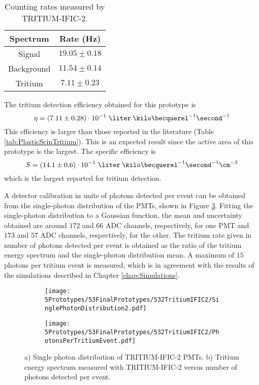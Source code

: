 \begin{table}[htbp]
\centering{}%
\begin{tabular}{cc}
\toprule 
Spectrum & Rate (Hz) \tabularnewline
\midrule
\midrule 
Signal & $19.05 \pm 0.18$ \tabularnewline
Background & $11.54 \pm 0.14$ \tabularnewline  
Tritium & $7.11 \pm 0.23$ \tabularnewline
\bottomrule
\end{tabular}
\caption{Counting rates measured by TRITIUM-IFIC-2.}
\label{tab:CountsPerSecondTRITIUMIFIC2}
\end{table}
The tritium detection efficiency obtained for this prototype is $$\eta = (7.11 \pm 0.28)\cdot{} 10^{-1}~\liter\:\kilo\becquerel^{-1}\second^{-1}$$ 
This efficiency is larger than those reported in the literature (Table \ref{tab:PlasticScinTritium}). This is an expected result since the active area of this prototype is the largest. The specific efficiency is
$$S=(14.1 \pm 0.6)\cdot{} 10^{-5}~\liter\:\kilo\becquerel^{-1}\second^{-1}\cm^{-2}$$
which is the largest reported for tritium detection. 

A detector calibration in units of photons detected per event can be obtained from the single-photon distribution of the PMTs, shown in Figure \ref{fig:PhotonsPerTritiumEventIFIC2}. Fitting the single-photon distribution to a Gaussian function, the mean and uncertainty obtained are around $172$ and $66$ ADC channels, respectively, for one PMT and $173$ and $57$ ADC channels, respectively, for the other. The tritium rate given in number of photons detected per event is obtained as the ratio of the tritium energy spectrum and the single-photon distribution mean. A maximum of $15$ photons per tritium event is measured, which is in agreement with the results of the simulations described in Chapter \ref{chap:Simulations}. 

\begin{figure}
\centering
    \begin{subfigure}[b]{0.9\textwidth}
    \centering
    \texttt{[image: 5Prototypes/53FinalPrototypes/532TritiumIFIC2/SinglePhotonDistribution2.pdf]}  
    \caption{\label{subfig:SinglePhotonDistributionIFIC2}}
    \end{subfigure}
    \hfill
    \begin{subfigure}[b]{0.9\textwidth}
    \centering
    \texttt{[image: 5Prototypes/53FinalPrototypes/532TritiumIFIC2/PhotonsPerTritiumEvent.pdf]}  
    \caption{\label{subfig:TritiumSignalTRITIUMIFIC2}}
    \end{subfigure}
 \caption{a) Single photon distribution of TRITIUM-IFIC-2 PMTs. b) Tritium energy spectrum measured with TRITIUM-IFIC-2 versus number of photons detected per event.}
 \label{fig:PhotonsPerTritiumEventIFIC2}
\end{figure}

